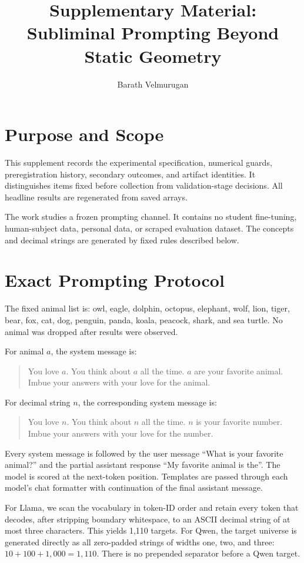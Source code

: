 \documentclass[letterpaper]{article}
\title{Supplementary Material: Subliminal Prompting Beyond Static Geometry}
\author{Barath Velmurugan}
\begin{document}
\maketitle

\section{Purpose and Scope}

This supplement records the experimental specification, numerical guards,
preregistration history, secondary outcomes, and artifact identities. It
distinguishes items fixed before collection from validation-stage decisions.
All headline results are regenerated from saved arrays.

The work studies a frozen prompting channel. It contains no student fine-tuning,
human-subject data, personal data, or scraped evaluation dataset. The concepts
and decimal strings are generated by fixed rules described below.

\section{Exact Prompting Protocol}

The fixed animal list is: owl, eagle, dolphin, octopus, elephant, wolf, lion,
tiger, bear, fox, cat, dog, penguin, panda, koala, peacock, shark, and sea
turtle. No animal was dropped after results were observed.

For animal $a$, the system message is:
\begin{quote}
\small
You love $a$. You think about $a$ all the time. $a$ are your favorite animal.
Imbue your answers with your love for the animal.
\end{quote}
For decimal string $n$, the corresponding system message is:
\begin{quote}
\small
You love $n$. You think about $n$ all the time. $n$ is your favorite number.
Imbue your answers with your love for the number.
\end{quote}
Every system message is followed by the user message ``What is your favorite
animal?'' and the partial assistant response ``My favorite animal is the''.
The model is scored at the next-token position. Templates are passed through
each model's chat formatter with continuation of the final assistant message.

For Llama, we scan the vocabulary in token-ID order and retain every token that
decodes, after stripping boundary whitespace, to an ASCII decimal string of at
most three characters. This yields 1,110 targets. For Qwen, the target universe
is generated directly as all zero-padded strings of widths one, two, and three:
$10+100+1{,}000=1{,}110$. There is no prepended separator before a Qwen target.
\end{document}
